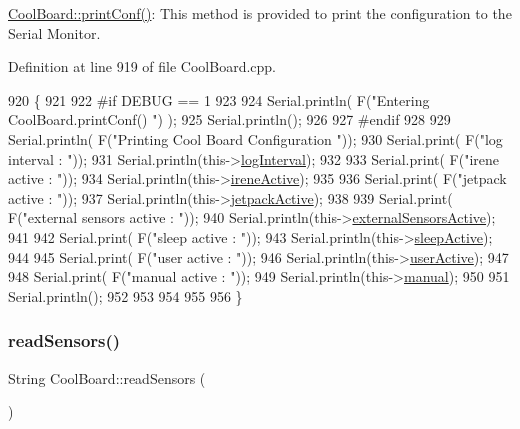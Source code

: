 \hyperlink{class_cool_board_a486507b8f0981d3cc671ed31c2145755}{Cool\+Board\+::print\+Conf()}\+: This method is provided to print the configuration to the Serial Monitor. 

Definition at line 919 of file Cool\+Board.\+cpp.


\begin{DoxyCode}
920 \{
921 
922 \textcolor{preprocessor}{#if DEBUG == 1}
923     
924     Serial.println( F(\textcolor{stringliteral}{"Entering CoolBoard.printConf() "}) );
925     Serial.println();
926 
927 \textcolor{preprocessor}{#endif}
928 
929     Serial.println( F(\textcolor{stringliteral}{"Printing Cool Board Configuration "}));
930     Serial.print( F(\textcolor{stringliteral}{"log interval       : "}));
931     Serial.println(this->\hyperlink{class_cool_board_a84bc94413b64973e4aba8c467c97006c}{logInterval});
932 
933     Serial.print( F(\textcolor{stringliteral}{"irene active       : "}));
934     Serial.println(this->\hyperlink{class_cool_board_a9c3f7ac625481ee2ae802a25d97a4ae0}{ireneActive});
935 
936     Serial.print( F(\textcolor{stringliteral}{"jetpack active     : "}));
937     Serial.println(this->\hyperlink{class_cool_board_a9be03a913d26e558328935ca3b59a75e}{jetpackActive});
938 
939     Serial.print( F(\textcolor{stringliteral}{"external sensors active    : "}));
940     Serial.println(this->\hyperlink{class_cool_board_a638b00b76aeb819ecfd4c10b8cdd7bb7}{externalSensorsActive});
941 
942     Serial.print( F(\textcolor{stringliteral}{"sleep active       : "}));
943     Serial.println(this->\hyperlink{class_cool_board_a0a51b2287139f66c738101fb53139230}{sleepActive});
944 
945     Serial.print( F(\textcolor{stringliteral}{"user active        : "}));
946     Serial.println(this->\hyperlink{class_cool_board_a6395459131d6889a3005f79c7a35e964}{userActive});
947 
948     Serial.print( F(\textcolor{stringliteral}{"manual active      : "}));
949     Serial.println(this->\hyperlink{class_cool_board_a7c8e505a5804b109e112d5a03df6ea2b}{manual});
950 
951     Serial.println();
952 
953 
954 
955 
956 \}
\end{DoxyCode}
\mbox{\label{class_cool_board_ad03abdce2e65f520bbf2cff0f2d083cf}} 
\subsubsection{\texorpdfstring{read\+Sensors()}{readSensors()}}
{\footnotesize\ttfamily String Cool\+Board\+::read\+Sensors (\begin{DoxyParamCaption}{ }\end{DoxyParamCaption})}

